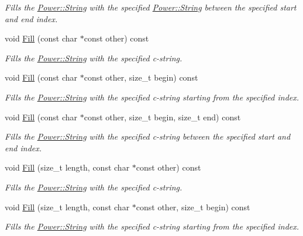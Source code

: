 \begin{DoxyCompactItemize}
\begin{DoxyCompactList}\small\item\em Fills the \hyperlink{class_power_1_1_string}{Power\+::\+String} with the specified \hyperlink{class_power_1_1_string}{Power\+::\+String} between the specified start and end index. \end{DoxyCompactList}\item 
void \hyperlink{class_power_1_1_string_a036580e1df3637db23e5e359f497200b}{Fill} (const char $\ast$const other) const
\begin{DoxyCompactList}\small\item\em Fills the \hyperlink{class_power_1_1_string}{Power\+::\+String} with the specified c-\/string. \end{DoxyCompactList}\item 
void \hyperlink{class_power_1_1_string_abc080efd52260d3c9f5c8a39e7108c94}{Fill} (const char $\ast$const other, size\+\_\+t begin) const
\begin{DoxyCompactList}\small\item\em Fills the \hyperlink{class_power_1_1_string}{Power\+::\+String} with the specified c-\/string starting from the specified index. \end{DoxyCompactList}\item 
void \hyperlink{class_power_1_1_string_a47b7175afd5bd1cdfd1d970d42e78b2d}{Fill} (const char $\ast$const other, size\+\_\+t begin, size\+\_\+t end) const
\begin{DoxyCompactList}\small\item\em Fills the \hyperlink{class_power_1_1_string}{Power\+::\+String} with the specified c-\/string between the specified start and end index. \end{DoxyCompactList}\item 
void \hyperlink{class_power_1_1_string_a2b89a279228596cafa6232007c7cc218}{Fill} (size\+\_\+t length, const char $\ast$const other) const
\begin{DoxyCompactList}\small\item\em Fills the \hyperlink{class_power_1_1_string}{Power\+::\+String} with the specified c-\/string. \end{DoxyCompactList}\item 
void \hyperlink{class_power_1_1_string_adfd34ce7307abbb1ba9b0bb649e57e5f}{Fill} (size\+\_\+t length, const char $\ast$const other, size\+\_\+t begin) const
\begin{DoxyCompactList}\small\item\em Fills the \hyperlink{class_power_1_1_string}{Power\+::\+String} with the specified c-\/string starting from the specified index. \end{DoxyCompactList}\item 

\end{DoxyCompactItemize}
